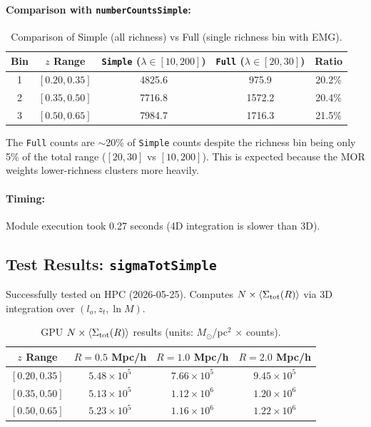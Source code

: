 \documentclass[a4paper, 11pt]{article}
\begin{document}
\paragraph{Comparison with \texttt{numberCountsSimple}:}

\begin{table}[H]
\centering
\begin{tabular}{@{}c c c c c@{}}
\toprule
Bin & $z$ Range & \texttt{Simple} ($\lambda \in [10,200]$) & \texttt{Full} ($\lambda \in [20,30]$) & Ratio \\
\midrule
1 & $[0.20, 0.35]$ & 4825.6 & 975.9 & 20.2\% \\
2 & $[0.35, 0.50]$ & 7716.8 & 1572.2 & 20.4\% \\
3 & $[0.50, 0.65]$ & 7984.7 & 1716.3 & 21.5\% \\
\bottomrule
\end{tabular}
\caption{Comparison of Simple (all richness) vs Full (single richness bin with EMG).}
\end{table}

The \texttt{Full} counts are $\sim$20\% of \texttt{Simple} counts despite the richness bin being only 5\% of the total range ($[20,30]$ vs $[10,200]$). This is expected because the MOR weights lower-richness clusters more heavily.

\paragraph{Timing:} Module execution took 0.27 seconds (4D integration is slower than 3D).

\subsection{Test Results: \texttt{sigmaTotSimple}}

Successfully tested on HPC (2026-05-25). Computes $N \times \langle\Sigma_{\rm tot}(R)\rangle$ via 3D integration over $(l_o, z_t, \ln M)$.

\begin{table}[H]
\centering
\begin{tabular}{@{}c c c c@{}}
\toprule
$z$ Range & $R=0.5$ Mpc/h & $R=1.0$ Mpc/h & $R=2.0$ Mpc/h \\
\midrule
$[0.20, 0.35]$ & $5.48 \times 10^5$ & $7.66 \times 10^5$ & $9.45 \times 10^5$ \\
$[0.35, 0.50]$ & $5.13 \times 10^5$ & $1.12 \times 10^6$ & $1.20 \times 10^6$ \\
$[0.50, 0.65]$ & $5.23 \times 10^5$ & $1.16 \times 10^6$ & $1.22 \times 10^6$ \\
\bottomrule
\end{tabular}
\caption{GPU $N \times \langle\Sigma_{\rm tot}(R)\rangle$ results (units: $M_\odot$/pc$^2$ $\times$ counts).}
\end{table}
\end{document}
